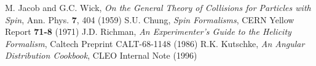 \begin{thebibliography}{99}

 M. Jacob and G.C. Wick, \textit{On the General Theory of Collisions for
  Particles with Spin}, Ann. Phys. \textbf{7}, 404 (1959)
 S.U. Chung, \textit{Spin Formalisms}, CERN Yellow Report \textbf{71-8} (1971)
 J.D. Richman, \textit{An Experimenter's Guide to the Helicity Formalism},
  Caltech Preprint CALT-68-1148 (1986)
 R.K. Kutschke, \textit{An Angular Distribution Cookbook}, CLEO Internal Note
  (1996)

\end{thebibliography}

